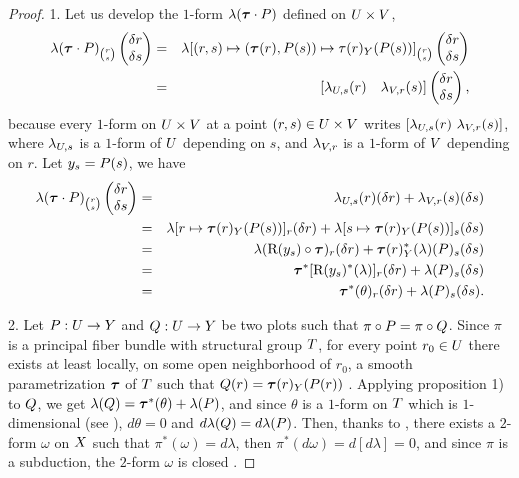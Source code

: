 \begin{proof}
  1. Let us develop the $1$-form $\lambda(\btau \cdot \P)$ defined on $\U \times \V$,
  \begin{eqnarray*}
    \lambda(\btau \cdot \P)_{r \choose s} \vect{\delta r \\ \delta s} & = & \lambda[(r,s) \mapsto (\btau(r),\P(s)) \mapsto \tau(r)_\Y (\P(s))]_{r \choose s}\vect{\delta r \\ \delta s} \\
    & = & [\lambda_{\U,s}(r) \quad \lambda_{\V,r}(s)] \vect{\delta r \\ \delta s},
  \end{eqnarray*}
  because every $1$-form on $\U \times \V$ at a point $(r,s) \in \U \times \V$ writes $[\lambda_{\U,s}(r) \ \lambda_{\V,r}(s)]$,
  where $\lambda_{\U,s}$ is a $1$-form of $\U$ depending on $s$,
  and $\lambda_{\V,r}$ is a $1$-form of $\V$ depending on $r$.
  Let $y_s = \P(s)$,
  we have
  \begin{eqnarray*}
    \lambda(\btau \cdot \P)_{r \choose s} \vect{ \delta r \\ \delta s} & = & \lambda_{\U,s}(r) (\delta r) + \lambda_{\V,r}(s)(\delta s) \\
    & = & \lambda[r \mapsto \btau(r)_\Y(\P(s))]_r(\delta r) + \lambda[s \mapsto \btau(r)_\Y(\P(s))]_s(\delta s) \\
    & = & \lambda(\orb{y_s} \circ \btau)_r(\delta r) + \btau(r)_\Y^*(\lambda)(\P)_s(\delta s) \\
    & = & \btau^*[\orb{y_s}^*(\lambda)]_r(\delta r) + \lambda(\P)_s(\delta s) \\
    & = & \btau^*(\theta)_r(\delta r) + \lambda(\P)_s(\delta s).
  \end{eqnarray*}
  
  2. Let $\P : \U \to \Y$ and $\Q: \U \to \Y$ be two plots such that $\pi \circ \P = \pi \circ \Q$.
  Since $\pi$ is a principal fiber bundle with structural group $\T$,
  for every point $r_0 \in \U$ there exists at least locally,
  on some open neighborhood of $r_0$,
  a smooth parametrization $\btau$ of $\T$ such that $\Q(r) = \btau(r)_\Y(\P(r))$ .
  Applying proposition 1) to $\Q$,
  we get $\lambda(\Q) = \btau^*(\theta) + \lambda(\P)$,
  and since $\theta$ is a $1$-form on $\T$ which is $1$-dimensional (see ),
  $d\theta = 0$ and $d\lambda(\Q) = d\lambda(\P)$.
  Then, thanks to ,
  there exists a $2$-form $\omega$ on $\X$ such that $\pi^*(\omega) = d\lambda$,
  then $\pi^*(d\omega) = d[d\lambda] = 0$,
  and since $\pi$ is a subduction,
  the $2$-form $\omega$ is closed .
  

\end{proof}
